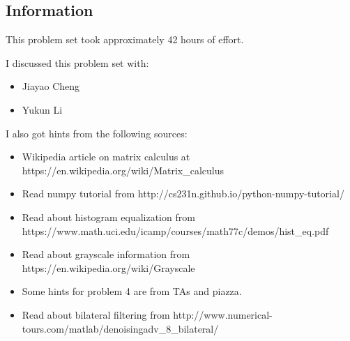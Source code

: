 \documentclass{article}
\newcommand{\info}{\clearpage \subsection*{Information}}
\begin{document}
\info

This problem set took approximately 42 hours of effort.

I discussed this problem set with:
\begin{itemize}
\item Jiayao Cheng
\item Yukun Li
\end{itemize}

I also got hints from the following sources:
\begin{itemize}
\item Wikipedia article on matrix calculus at https://en.wikipedia.org/wiki/Matrix\_calculus
\item Read numpy tutorial from http://cs231n.github.io/python-numpy-tutorial/
\item Read about histogram equalization from https://www.math.uci.edu/icamp/courses/math77c/demos/hist\_eq.pdf
\item Read about grayscale information from https://en.wikipedia.org/wiki/Grayscale
\item Some hints for problem 4 are from TAs and piazza.
\item Read about bilateral filtering from http://www.numerical-tours.com/matlab/denoisingadv\_8\_bilateral/
\end{itemize}
\end{document}
